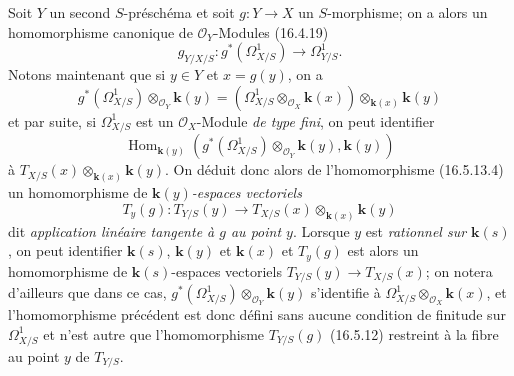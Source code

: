 \begin{env}[16.5.13]
Soit $Y$ un second $S$-préschéma et soit $g:Y\to X$ un $S$-morphisme; on a
alors un homomorphisme canonique de $\mathcal{O}_Y$-Modules (16.4.19)
\[
  g_{Y/X/S}:g^*(\varOmega_{X/S}^1)\longrightarrow\varOmega_{Y/S}^1.
  \tag{16.5.13.4}
  \label{IV.16.5.13.4}
\]
Notons maintenant que si $y\in Y$ et $x=g(y)$, on a
\[
  g^*(\varOmega_{X/S}^1)\otimes_{\mathcal{O}_Y}\boldsymbol{k}(y)
  =(\varOmega_{X/S}^1\otimes_{\mathcal{O}_X}\boldsymbol{k}(x))
  \otimes_{\mathbf{k}(x)}\boldsymbol{k}(y)
\]
et par suite, si $\varOmega_{X/S}^1$ est un $\mathcal{O}_X$-Module
\emph{de type fini}, on peut identifier
\[
  \operatorname{Hom}_{\mathbf{k}(y)}
  (g^*(\varOmega_{X/S}^1)\otimes_{\mathcal{O}_Y}\boldsymbol{k}(y),\boldsymbol{k}(y))
\]
à $T_{X/S}(x)\otimes_{\mathbf{k}(x)}\boldsymbol{k}(y)$. On déduit donc alors de l'homomorphisme
(16.5.13.4) un homomorphisme de \emph{$\boldsymbol{k}(y)$-espaces vectoriels}
\[
  T_y(g):T_{Y/S}(y)\longrightarrow
  T_{X/S}(x)\otimes_{\mathbf{k}(x)}\boldsymbol{k}(y)
  \tag{16.5.13.5}
  \label{IV.16.5.13.5}
\]
dit \emph{application linéaire tangente à $g$ au point $y$}. Lorsque $y$ est
\emph{rationnel sur $\boldsymbol{k}(s)$}, on peut identifier $\boldsymbol{k}(s)$, $\boldsymbol{k}(y)$ et $\boldsymbol{k}(x)$ et
$T_y(g)$ est alors un homomorphisme de $\boldsymbol{k}(s)$-espaces vectoriels
$T_{Y/S}(y)\to T_{X/S}(x)$; on notera d'ailleurs que dans ce cas,
$g^*(\varOmega_{X/S}^1)\otimes_{\mathcal{O}_Y}\boldsymbol{k}(y)$ s'identifie à
$\varOmega_{X/S}^1\otimes_{\mathcal{O}_X}\boldsymbol{k}(x)$, et l'homomorphisme précédent est
donc défini sans aucune condition de finitude sur $\varOmega_{X/S}^1$ et n'est
autre que l'homomorphisme $T_{Y/S}(g)$ (16.5.12) restreint à la fibre au point
$y$ de $T_{Y/S}$.
\end{env}


